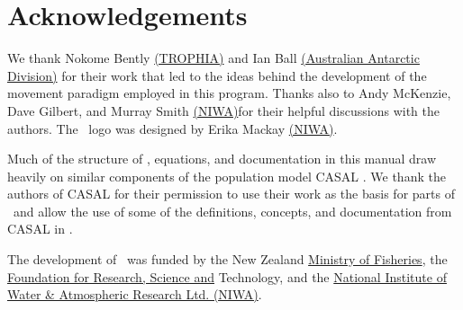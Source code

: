 \section{Acknowledgements\label{sec:acknowledgements}}

We thank Nokome Bently \href{http://www.trophia.co.nz}{(TROPHIA)} and Ian Ball \href{http://www.aad.gov.au}{(Australian Antarctic Division)} for their work that led to the ideas behind the development of the movement paradigm employed in this  program. Thanks also to Andy McKenzie, Dave Gilbert, and Murray Smith \href{http://www.niwa.co.nz}{(NIWA)}for their helpful discussions with the authors. The \SPM\ logo was designed by Erika Mackay \href{http://www.niwa.co.nz}{(NIWA)}. 

Much of the structure of \SPM, equations, and documentation in this manual draw heavily on similar components of the population model CASAL \citep{1388}. We thank the authors of CASAL for their permission to use their work as the basis for parts of \SPM\ and allow the use of some of the definitions, concepts, and documentation from CASAL in \SPM. 

The development of \SPM\ was funded by the New Zealand \href{http://www.fish.govt.nz}{Ministry of Fisheries}, the \href{http://www.frst.govt.nz}{Foundation for Research, Science and} Technology, and the \href{http://www.niwa.co.nz}{National Institute of Water \& Atmospheric Research Ltd. (NIWA)}. 
